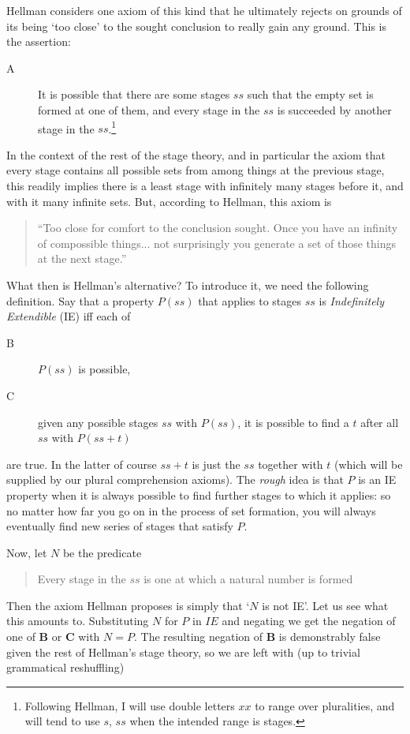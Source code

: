 \documentclass{article}
\theoremstyle{definition}
\begin{document}
Hellman considers one axiom of this kind 
that he ultimately rejects on grounds of its being `too close' 
to the sought conclusion to really gain any ground. This is the assertion:
\begin{description}
\item[A] It is possible that there are some stages $ss$ 
such that the empty set is formed at one of them, 
and every stage in the $ss$ is succeeded by another stage in the $ss$.\footnote{
    Following Hellman, I will use double letters $xx$ to range over pluralities, 
    and will tend to use $s$, $ss$ when the intended range is stages.
    }
\end{description}
In the context of the rest of the stage theory, 
and in particular the axiom that every stage contains all possible sets 
from among things at the previous stage,
this readily implies there is a least stage with infinitely many stages before it, 
and with it many infinite sets. But, according to Hellman, this axiom is 
\begin{quote} ``Too close for comfort to the conclusion sought. 
    Once you have an infinity of compossible things... 
    not surprisingly you generate a set of those things at the next stage.''\end{quote}
What then is Hellman's alternative? To introduce it, 
we need the following definition. 
Say that a property $P(ss)$ that applies to stages $ss$ is
 \emph{Indefinitely Extendible} (IE) 
iff each of

\begin{description} 
    \item[B]    $P(ss)$ is possible,
    \item[C]    given any possible stages $ss$ with $P(ss)$, 
                it is possible to find a $t$ after all $ss$ with $P(ss + t)$
\end{description}
are true. In the latter of course $ss + t$ is just 
the $ss$ together with $t$ (which will be supplied by 
our plural comprehension axioms). The \emph{rough} idea is that $P$ is 
an IE property when it is always possible to find further 
stages to which it applies: so no matter how far you go on 
in the process of set formation, you will always eventually 
find new series of stages that satisfy $P$.

Now, let $N$ be the predicate
\begin{quote} Every stage in the $ss$ is one at which a natural number is formed
\end{quote} 
Then the axiom Hellman proposes is simply that `$N$ is not IE'. 
Let us see what this amounts to. Substituting $N$ for $P$ in $IE$ 
and negating we get the negation of one of {\bf B} or {\bf C} with $N = P$. 
The resulting negation of {\bf B} is demonstrably false 
given the rest of Hellman's stage theory, 
so we are left with (up to trivial grammatical reshuffling)
\end{document}
